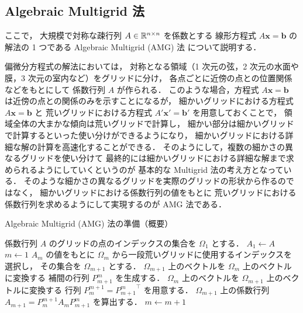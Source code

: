 \subsection{Algebraic Multigrid 法}


ここで，
大規模で対称な疎行列 $A \in \mathbb{R}^{n \times n}$ を係数とする
線形方程式 $A \bm{x} = \bm{b}$ の解法の 1 つである
Algebraic Multigrid (AMG) 法
\cite{Ruge1987}
について説明する．

偏微分方程式の解法においては，
対称となる領域（1 次元の弦，2 次元の水面や膜，3 次元の室内など）をグリッドに分け，
各点ごとに近傍の点との位置関係などをもとにして
係数行列 $A$ が作られる．
このような場合，方程式 $A \bm{x} = \bm{b}$ は近傍の点との関係のみを示すことになるが，
細かいグリッドにおける方程式 $A \bm{x} = \bm{b}$ と
荒いグリッドにおける方程式 $A' \bm{x}' = \bm{b}'$ を用意しておくことで，
領域全体の大まかな傾向は荒いグリッドで計算し，
細かい部分は細かいグリッドで計算するといった使い分けができるようになり，
細かいグリッドにおける詳細な解の計算を高速化することができる．
そのようにして，複数の細かさの異なるグリッドを使い分けて
最終的には細かいグリッドにおける詳細な解まで求められるようにしていくというのが
基本的な Multigrid 法の考え方となっている．
そのような細かさの異なるグリッドを実際のグリッドの形状から作るのではなく，
細かいグリッドにおける係数行列の値をもとに
荒いグリッドにおける係数行列を求めるようにして実現するのが
AMG 法である．

\begin{algorithm}[tp]
    \caption{Algebraic Multigrid (AMG) 法の準備（概要） \cite{Ruge1987,Wolters2002}}
    \label{alg:matrix-computation_amg_setup}
    \begin{algorithmic}
        \State 係数行列 $A$ のグリッドの点のインデックスの集合を $\Omega_1$ とする．
        \State $A_1 \gets A$
        \State $m \gets 1$
        \Loop
        \State $A_m$ の値をもとに $\Omega_m$ から一段荒いグリッドに使用するインデックスを選択し，
        その集合を $\Omega_{m+1}$ とする．
        \State $\Omega_{m+1}$ 上のベクトルを $\Omega_{m}$ 上のベクトルに変換する
        補間の行列 $P_{m+1}^{m}$ を生成する．
        \State $\Omega_{m}$ 上のベクトルを $\Omega_{m+1}$ 上のベクトルに変換する
        行列 $P_{m}^{m+1} = {P_{m+1}^{m}}^\top$ を用意する．
        \State $\Omega_{m+1}$ 上の係数行列 $A_{m+1} = P_{m}^{m+1} A_{m} P_{m+1}^{m}$ を算出する．
        \State \Return
        \EndIf
        \State $m \gets m + 1$
        \EndLoop
        \EndProcedure
    \end{algorithmic}
\end{algorithm}

